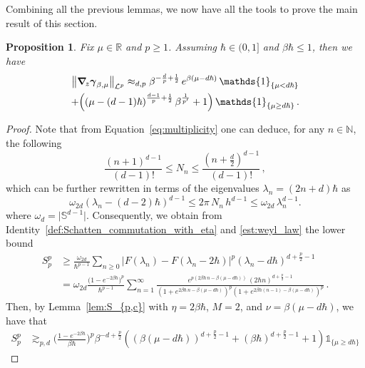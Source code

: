 \documentclass[11pt]{amsart}
\theoremstyle{plain}
\newtheorem{prop}[theorem]{Proposition}
\theoremstyle{definition}
\newcommand		{\N}		{\mathbb N}			%
\newcommand		{\RR}		{\mathbb R}			%
\newcommand		{\R}		{\RR}
\renewcommand	{\SS}		{\mathds S}			%
\newcommand		{\cL}		{\mathcal L}		%
\newcommand		{\lt}			{\left}				%
\newcommand		{\rt}			{\right}			%
\renewcommand	{\(}			{\lt(}
\renewcommand	{\)}			{\rt)}
\newcommand		{\n}[1]			{\lt\lvert #1 \rt\rvert}
\newcommand		{\nrm}[1]		{\lt\lVert #1\rt\rVert}
\newcommand		{\Nrm}[2]		{\nrm{#1}_{#2}}
\newcommand		{\indic}	{\mathds{1}}		%
\newcommand		{\opgam}	{{\boldsymbol{\gamma}}}	%
\newcommand		{\Dh}		{\boldsymbol{\nabla}}	%
\newcommand		{\Dhz}[1]	{\Dh_{\!z} #1}
\begin{document}
	Combining all the previous lemmas, we now have all the tools to prove the main result of this section.
	\begin{prop}\label{prop:higher_temp_comm-est}
		Fix $\mu\in \R$ and $p\ge 1$. Assuming $\hbar \in (0, 1]$ and $\beta \hbar\le 1$, 
		then we have 
		\begin{multline}
			\Nrm{ \Dhz \opgam_{\beta, \mu} }{\cL^p}
			\approx_{d, p} \beta^{-\frac{d}{p}+\frac{1}{2}} \, e^{\beta (\mu-d\hbar)} \, \indic_{\{\mu < d\hbar\}} \\
			+\Bigl( \lt(\mu-(d-1)\hbar\rt)^{\frac{d-1}{p}+\frac{1}{2}} \beta^\frac{1}{p'} +1\Bigr) \, \indic_{\{\mu \ge d\hbar\}}\,.
		\end{multline}
	\end{prop}

	\begin{proof}
		Note that from Equation~\eqref{eq:multiplicity} one can deduce, for any $n\in\N$, the following
		\begin{equation*}
			\frac{(n+1)^{d-1}}{\lt(d-1\rt)!} \leq N_n \leq \frac{(n+\frac{d}{2})^{d-1}}{\lt(d-1\rt)!} \,,
		\end{equation*}
		which can be further rewritten in terms of  the eigenvalues $\lambda_n = \lt(2n+d\rt)\hbar$ as
		\begin{equation}\label{est:weyl_law}
			\omega_{2d} \lt(\lambda_n-(d-2)\hbar\rt)^{d-1} \leq 2\pi\, N_n\,h^{d-1} \leq \omega_{2d} \, \lambda_n^{d-1}.
		\end{equation}
		where $\omega_d = \bigl|\SS^{d-1}\bigr|$. Consequently, we obtain from Identity~\eqref{def:Schatten_commutation_with_eta} and \eqref{est:weyl_law} the lower bound
		\begin{align*}
			S_p^p &\ge \frac{\omega_{2d}}{\hbar^{p-1}}\sum_{n\geq 0} \n{F(\lambda_n) - F(\lambda_n-2\hbar)}^p \lt(\lambda_n-d\hbar\rt)^{d+\frac{p}{2}-1}
			\\
			&= \omega_{2d}\frac{\bigl(1-e^{-2\beta\hbar}\bigr)^p}{\hbar^{p-1}}\sum_{n=1}^\infty \frac{e^{p\lt(2\beta\hbar\,n-\beta\lt(\mu-d\hbar\rt)\rt)} \, \lt(2\hbar n\rt)^{d+\frac{p}{2}-1}}{\lt(1 + e^{2\beta\hbar\,n-\beta\lt(\mu-d\hbar\rt)}\rt)^p \lt(1 + e^{2\beta\hbar\lt(n-1\rt)-\beta\lt(\mu-d\hbar\rt)}\rt)^p} \,.
		\end{align*}
        Then, by  Lemma~\ref{lem:S_{p,c}} with $\eta = 2\beta\hbar$, $M=2$, and $\nu = \beta(\mu-d\hbar)$, we have that 
        \begin{align*}
			S^p_p &\gtrsim_{p, d} \biggl(\frac{1-e^{-2\beta\hbar}}{\beta\hbar}\biggr)^p \beta^{-d+\frac{p}{2}} \lt(\lt(\beta\lt(\mu-d\hbar\rt)\rt)^{d+\frac{p}{2}-1} + \lt(\beta\hbar\rt)^{d+\frac{p}{2}-1}+1\rt) \indic_{\{\mu \ge d\hbar\}}

\end{align*}
\end{proof}
\end{document}
